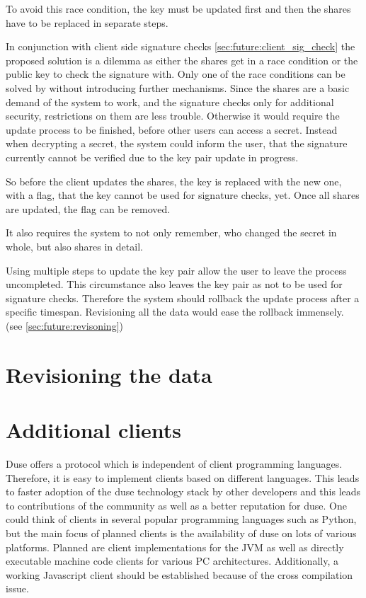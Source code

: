 To avoid this race condition, the key must be updated first and then the shares
have to be replaced in separate steps.

In conjunction with client side signature checks
\ref{sec:future:client_sig_check} the proposed solution is a dilemma as either
the shares get in a race condition or the public key to check the signature
with. Only one of the race conditions can be solved by without introducing
further mechanisms. Since the shares are a basic demand of the system to work,
and the signature checks only for additional security, restrictions on them are
less trouble. Otherwise it would require the update process to be finished,
before other users can access a secret. Instead when decrypting a secret, the
system could inform the user, that the signature currently cannot be verified
due to the key pair update in progress.

So before the client updates the shares, the key is replaced with the new one,
with a flag, that the key cannot be used for signature checks, yet. Once all
shares are updated, the flag can be removed.

It also requires the system to not only remember, who changed the secret in
whole, but also shares in detail.

Using multiple steps to update the key pair allow the user to leave the process
uncompleted. This circumstance also leaves the key pair as not to be used for
signature checks. Therefore the system should rollback the update process after
a specific timespan. Revisioning all the data would ease the rollback
immensely. (see \ref{sec:future:revisoning})

\section{Revisioning the data}

\section{Additional clients}

Duse offers a protocol which is independent of client programming languages.
Therefore, it is easy to implement clients based on different
languages. This leads to faster adoption of the duse technology stack by
other developers and this leads to contributions of the community as well
as a better reputation for duse. One could think of clients in several
popular programming languages such as Python, but the main focus of planned
clients is the availability of duse on lots of various platforms.
Planned are client implementations for the JVM as well as directly executable
machine code clients for various PC architectures. Additionally, a working
Javascript client should be established because of the cross compilation issue.

